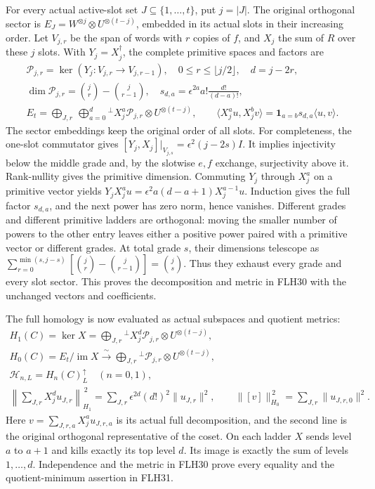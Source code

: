 For every actual active-slot set \(J\subseteq\{1,\ldots,t\}\),
put \(j=|J|\). The original orthogonal sector is
\(E_J=W^{\otimes j}\otimes U^{\otimes(t-j)}\), embedded in its
actual slots in their increasing order. Let \(V_{j,r}\) be
the span of words with \(r\) copies of \(f\), and \(X_j\) the
sum of \(R\) over these \(j\) slots. With \(Y_j=X_j^\dagger\),
the complete primitive spaces and factors are
\[
\begin{gathered}
\mathcal P_{j,r}=\ker(Y_j:V_{j,r}\to V_{j,r-1}),\quad
0\le r\le\lfloor j/2\rfloor,\quad d=j-2r,\\
\dim\mathcal P_{j,r}=\binom jr-\binom j{r-1},\quad
s_{d,a}=\epsilon^{2a}a!\frac{d!}{(d-a)!},\\
E_t=\bigoplus_{J,r}\ \bigoplus_{a=0}^{d}{}^\perp
 X_j^a\mathcal P_{j,r}\otimes U^{\otimes(t-j)},\qquad
\langle X_j^au,X_j^bv\rangle
 =\mathbf1_{a=b}s_{d,a}\langle u,v\rangle .
\end{gathered}\tag{FLH30}
\]
The sector embeddings keep the original order of all slots.
For completeness, the one-slot commutator gives
\([Y_j,X_j]|_{V_{j,s}}=\epsilon^2(j-2s)I\).
It implies injectivity below the middle grade and, by the
slotwise \(e,f\) exchange, surjectivity above it. Rank-nullity
gives the primitive dimension. Commuting \(Y_j\) through
\(X_j^a\) on a primitive vector yields
\(Y_jX_j^au=\epsilon^2a(d-a+1)X_j^{a-1}u\).
Induction gives the full factor \(s_{d,a}\), and the next
power has zero norm, hence vanishes. Different grades and
different primitive ladders are orthogonal: moving the smaller
number of powers to the other entry leaves either a positive
power paired with a primitive vector or different grades.
At total grade \(s\), their dimensions telescope as
\(\sum_{r=0}^{\min(s,j-s)}[\binom jr-\binom j{r-1}]
=\binom js\). Thus they exhaust every grade and every slot
sector. This proves the decomposition and metric in FLH30
with the unchanged vectors and coefficients.

The full homology is now evaluated as actual subspaces and
quotient metrics:
\[
\begin{gathered}
H_1(C)=\ker X
 =\bigoplus_{J,r}{}^\perp
       X_j^d\mathcal P_{j,r}\otimes U^{\otimes(t-j)},\\
H_0(C)=E_t/\operatorname{im}X
 \xrightarrow{\ \sim\ }
 \bigoplus_{J,r}{}^\perp
       \mathcal P_{j,r}\otimes U^{\otimes(t-j)},\\
\mathcal H_{n,L}=H_n(C)_L^\uparrow\quad(n=0,1),\\
\left\|\sum_{J,r}X_j^d u_{J,r}\right\|_{H_1}^{\,2}
   =\sum_{J,r}\epsilon^{2d}(d!)^2\|u_{J,r}\|^2,\qquad
\|[v]\|_{H_0}^{\,2}=\sum_{J,r}\|u_{J,r,0}\|^2 .
\end{gathered}\tag{FLH31}
\]
Here \(v=\sum_{J,r,a}X_j^a u_{J,r,a}\) is its actual full
decomposition, and the second line is the original orthogonal
representative of the coset. On each ladder \(X\) sends level
\(a\) to \(a+1\) and kills exactly its top level \(d\).
Its image is exactly the sum of levels \(1,\ldots,d\).
Independence and the metric in FLH30 prove every equality
and the quotient-minimum assertion in FLH31.

